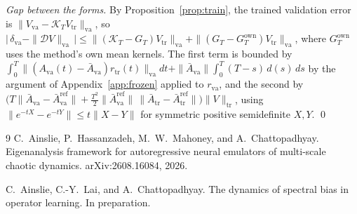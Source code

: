 \documentclass[11pt]{article}
\theoremstyle{definition}
\theoremstyle{remark}
\newcommand{\tr}{\mathrm{tr}}
\newcommand{\va}{\mathrm{va}}
\newcommand{\Dmap}{\mathcal{D}}
\newcommand{\Kmap}{\mathcal{K}}
\newcommand{\refm}{\mathrm{ref}}
\begin{document}
\emph{Gap between the forms.}
By Proposition~\ref{prop:train}, the trained validation error is $\|V_\va - \Kmap_TV_\tr\|_\va$, so
$\big|\,\delta_\va - \|\Dmap V\|_\va\,\big| \le \|(\Kmap_T - G_T)V_\tr\|_\va + \|(G_T - G_T^{\mathrm{own}})V_\tr\|_\va$, where $G_T^{\mathrm{own}}$ uses the method's own mean kernels.
The first term is bounded by $\int_0^T\|(A_\va(t) - \bar A_\va)r_\tr(t)\|_\va dt + \|\bar A_\va\|\int_0^T(T-s)\,d(s)\,ds$ by the argument of Appendix~\ref{app:frozen} applied to $r_\va$, and the second by $\big(T\|\bar A_\va - \bar A_\va^\refm\| + \tfrac{T^2}{2}\|\bar A_\va^\refm\|\,\|\bar A_\tr - \bar A_\tr^\refm\|\big)\|V\|_\tr$, using $\|e^{-tX} - e^{-tY}\| \le t\|X - Y\|$ for symmetric positive semidefinite $X, Y$. \qed

\begin{thebibliography}{9}
C.~Ainslie, P.~Hassanzadeh, M.~W.~Mahoney, and A.~Chattopadhyay.
Eigenanalysis framework for autoregressive neural emulators of multi-scale chaotic dynamics.
arXiv:2608.16084, 2026.

C.~Ainslie, C.-Y.~Lai, and A.~Chattopadhyay.
The dynamics of spectral bias in operator learning.
In preparation.
\end{thebibliography}
\end{document}
